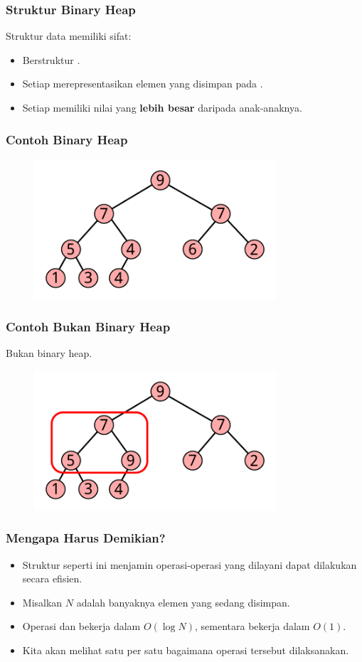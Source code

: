 \begin{frame}
\frametitle{Struktur Binary Heap}
Struktur data \pbinaryHeap memiliki sifat:
\begin{itemize}
  \item Berstruktur .
  \item Setiap \fnode merepresentasikan elemen yang disimpan pada \pheap.
  \item Setiap \fnode memiliki nilai yang \textbf{lebih besar} daripada \fnode anak-anaknya.
\end{itemize}
\end{frame}

\begin{frame}
\frametitle{Contoh Binary Heap}
\begin{figure}
  \includegraphics[width=9cm]{asset/heap.pdf}
\end{figure}
\end{frame}

\begin{frame}
\frametitle{Contoh Bukan Binary Heap}
Bukan binary heap.
\begin{figure}
  \includegraphics[width=9cm]{asset/not-heap.pdf}
\end{figure}
\end{frame}

\begin{frame}
\frametitle{Mengapa Harus Demikian?}
\begin{itemize}
  \item Struktur seperti ini menjamin operasi-operasi yang dilayani \pheap dapat dilakukan secara efisien.
  \item Misalkan $N$ adalah banyaknya elemen yang sedang disimpan.
  \item Operasi  dan  bekerja dalam $O(\log{N})$, sementara  bekerja dalam $O(1)$.
  \item Kita akan melihat satu per satu bagaimana operasi tersebut dilaksanakan.
\end{itemize}
\end{frame}

